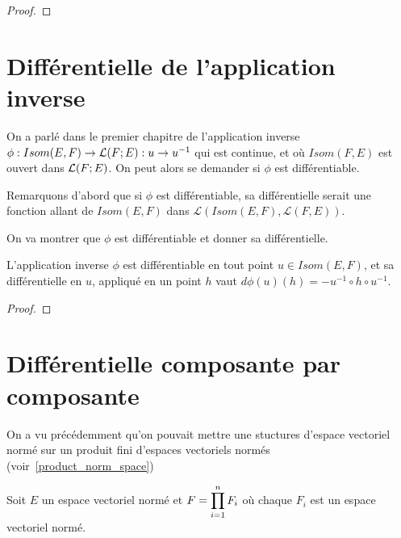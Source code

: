 \ifdefined\outputproof
\begin{proof}

\end{proof}
\fi

\section{Différentielle de l'application inverse}

On a parlé dans le premier chapitre de l'application inverse
$\phi : Isom(E, F) \rightarrow \mathcal{L}(F; E) : u \rightarrow
u^{-1}$ qui est continue, et où $Isom(F, E)$ est ouvert dans
$\mathcal{L}(F; E)$.
On peut alors se demander si $\phi$ est différentiable.

Remarquons d'abord que si $\phi$ est différentiable, sa différentielle serait
une fonction allant de $Isom(E, F)$ dans $\mathcal{L}(Isom(E, F), \mathcal{L}(F,
E))$.

On va montrer que $\phi$ est différentiable et donner sa différentielle.

\begin{theorem}
\label{differential_inverse_application}
	L'application inverse $\phi$ est différentiable en tout point $u \in Isom(E,
	F)$, et sa différentielle en $u$, appliqué en un point $h$ vaut $d\phi(u)(h)
	= -u^{-1} \circ h \circ u^{-1}$.
\end{theorem}

\ifdefined\outputproof
\begin{proof}

\end{proof}
\fi

\section{Différentielle composante par composante}
\label{section_differential_composante}


On a vu précédemment qu'on pouvait mettre une stuctures d'espace vectoriel
normé sur un produit fini d'espaces vectoriels normés (voir~\ref{product_norm_space})

Soit $E$ un espace vectoriel normé et $F = \displaystyle \prod_{i = 1}^{n} F_{i}$ où chaque
$F_{i}$ est un espace vectoriel normé.

